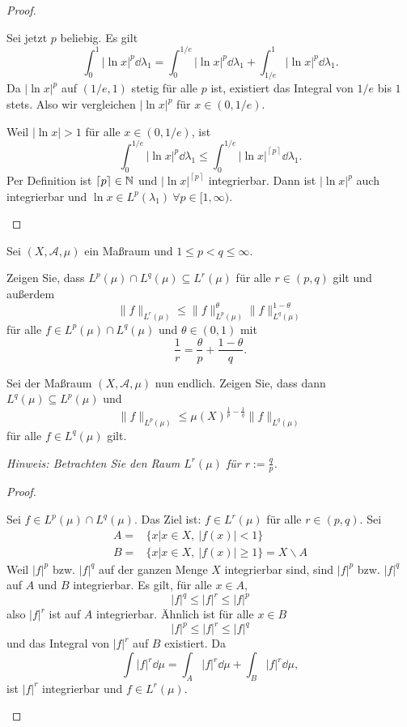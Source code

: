 \begin{proof}
\begin{parts}
	Sei jetzt $p$ beliebig. Es gilt
	\[
		\int_0^1 |\ln x|^p\dd{\lambda_1}=\int_0^{1 / e}|\ln x|^p\dd{\lambda_1}+\int_{1 / e}^1 |\ln x|^p\dd{\lambda_1}
	.\] 
	Da $|\ln x|^p$ auf $(1 / e, 1)$ stetig f\"{u}r alle $p$ ist, existiert das Integral von $1 / e$ bis $1$ stets. Also wir vergleichen $|\ln x|^p$ f\"{u}r $x\in (0,1 / e)$. 

	Weil $|\ln x|>1$ f\"{u}r alle $x\in (0, 1 / e)$, ist
	\[
		\int_0^{1 / e}|\ln x|^p\dd{\lambda_1}\le \int_0^{1 / e}|\ln x|^{\left\lceil  p \right\rceil}\dd{\lambda_1} 
	.\] 
	Per Definition ist $\left\lceil p \right\rceil \in \mathbb{N}$ und $|\ln x|^{\left\lceil p \right\rceil }$ integrierbar. Dann ist $|\ln x|^p$ auch integrierbar und $\ln x\in L^p(\lambda_1)~\forall p\in [1,\infty)$.\qedhere
	\end{parts}
\end{proof}
\begin{Problem}
	Sei $(X, \mathcal{A},\mu)$ ein Maßraum und $1\le p<q\le\infty$.
	\begin{parts}
	\item Zeigen Sie, dass $L^p(\mu)\cap L^q(\mu)\subseteq L^r(\mu)$ f\"{u}r alle $r\in (p,q)$ gilt und außerdem
		\[
			\|f\|_{L^r(\mu)}\le \|f\|_{L^p(\mu)}^\theta \|f\|_{L^q(\mu)}^{1-\theta}
		\] 
		f\"{u}r alle $f\in L^p(\mu)\cap L^q(\mu)$ und $\theta\in (0,1)$ mit
		\[
		\frac{1}{r}=\frac{\theta}{p}+\frac{1-\theta}{q}
		.\] 
	\item Sei der Maßraum $(X,\mathcal{A},\mu)$ nun endlich. Zeigen Sie, dass dann $L^q(\mu)\subseteq L^p(\mu)$ und
		\[
			\|f\|_{L^p(\mu)}\le \mu(X)^{\frac{1}{p}-\frac{1}{q}}\|f\|_{L^q(\mu)}
		\] 
		f\"{u}r alle $f\in L^q(\mu)$ gilt.

		\emph{Hinweis: Betrachten Sie den Raum $L^r(\mu)$ f\"{u}r $r:=\frac{q}{p}$.}
	\end{parts}
\end{Problem}
\begin{proof}
	\begin{parts}
	\item Sei $f\in L^p(\mu)\cap L^q(\mu)$. Das Ziel ist: $f\in L^r(\mu)$ f\"{u}r alle $r\in (p,q)$. Sei
\begin{align*}
	A=&\{x|x\in X,~|f(x)|<1\} \\
	B=&\{x|x\in X,~|f(x)|\ge 1\}=X\backslash A
\end{align*}
Weil $|f|^p$ bzw. $|f|^q$ auf der ganzen Menge $X$ integrierbar sind, sind $|f|^p$ bzw. $|f|^q$ auf $A$ und $B$ integrierbar. Es gilt, f\"{u}r alle $x\in A$,
\[
|f|^q \le |f|^r \le |f|^p
\]
also $|f|^r$ ist auf $A$ integrierbar. Ähnlich ist f\"{u}r alle $x\in B$ 
\[
|f|^p\le |f|^r\le |f|^q
\]
und das Integral von $|f|^r$ auf $B$ existiert. Da
\[
	\int |f|^r\dd{\mu}=\int_A |f|^r\dd{\mu}+\int_B |f|^r\dd{\mu}
,\]
ist $|f|^r$ integrierbar und $f\in L^r(\mu)$.\qedhere 
	\end{parts}
\end{proof}
